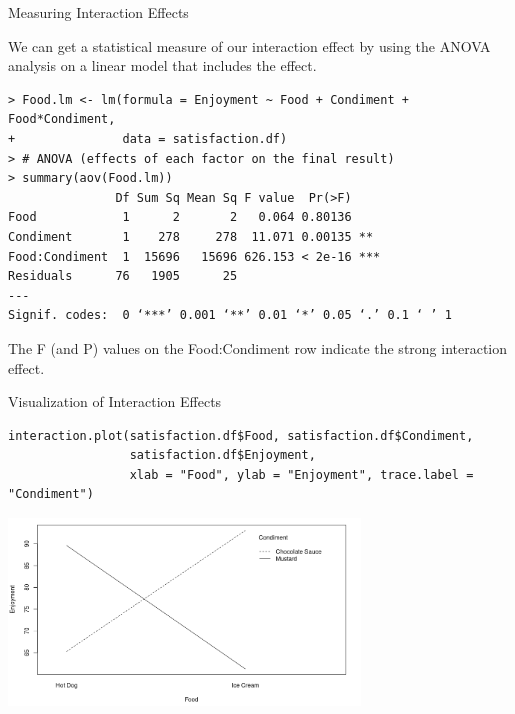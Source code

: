 \begin{frame}[fragile]{Measuring Interaction Effects}{}

  We can get a statistical measure of our interaction effect by using
  the ANOVA analysis on a linear model that includes the effect.

  {\smaller
\begin{verbatim}
> Food.lm <- lm(formula = Enjoyment ~ Food + Condiment + Food*Condiment, 
+               data = satisfaction.df)
> # ANOVA (effects of each factor on the final result)
> summary(aov(Food.lm))
               Df Sum Sq Mean Sq F value  Pr(>F)    
Food            1      2       2   0.064 0.80136    
Condiment       1    278     278  11.071 0.00135 ** 
Food:Condiment  1  15696   15696 626.153 < 2e-16 ***
Residuals      76   1905      25                    
---
Signif. codes:  0 ‘***’ 0.001 ‘**’ 0.01 ‘*’ 0.05 ‘.’ 0.1 ‘ ’ 1
\end{verbatim}}
    The F (and P) values on the Food:Condiment row indicate the strong interaction effect.

\end{frame}

\begin{frame}[fragile]{Visualization of Interaction Effects}{}

{\smaller
\begin{verbatim}
interaction.plot(satisfaction.df$Food, satisfaction.df$Condiment, 
                 satisfaction.df$Enjoyment, 
                 xlab = "Food", ylab = "Enjoyment", trace.label = "Condiment")
\end{verbatim}}

\begin{center}
  \includegraphics[width=0.7\textwidth]{../img/interactionplot_condiment.png}
\end{center}
\end{frame}

